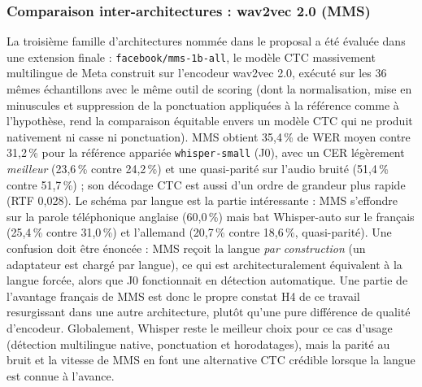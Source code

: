 \documentclass[12pt]{report}
\begin{document}
\subsubsection{Comparaison inter-architectures : wav2vec 2.0 (MMS)}
La troisième famille d'architectures nommée dans le proposal a été évaluée dans une extension finale : \texttt{facebook/mms-1b-all}, le modèle CTC massivement multilingue de Meta construit sur l'encodeur wav2vec 2.0, exécuté sur les 36 mêmes échantillons avec le même outil de scoring (dont la normalisation, mise en minuscules et suppression de la ponctuation appliquées à la référence comme à l'hypothèse, rend la comparaison équitable envers un modèle CTC qui ne produit nativement ni casse ni ponctuation). MMS obtient 35,4\,\% de WER moyen contre 31,2\,\% pour la référence appariée \texttt{whisper-small} (J0), avec un CER légèrement \emph{meilleur} (23,6\,\% contre 24,2\,\%) et une quasi-parité sur l'audio bruité (51,4\,\% contre 51,7\,\%) ; son décodage CTC est aussi d'un ordre de grandeur plus rapide (RTF 0,028). Le schéma par langue est la partie intéressante : MMS s'effondre sur la parole téléphonique anglaise (60,0\,\%) mais bat Whisper-auto sur le français (25,4\,\% contre 31,0\,\%) et l'allemand (20,7\,\% contre 18,6\,\%, quasi-parité). Une confusion doit être énoncée : MMS reçoit la langue \emph{par construction} (un adaptateur est chargé par langue), ce qui est architecturalement équivalent à la langue forcée, alors que J0 fonctionnait en détection automatique. Une partie de l'avantage français de MMS est donc le propre constat H4 de ce travail resurgissant dans une autre architecture, plutôt qu'une pure différence de qualité d'encodeur. Globalement, Whisper reste le meilleur choix pour ce cas d'usage (détection multilingue native, ponctuation et horodatages), mais la parité au bruit et la vitesse de MMS en font une alternative CTC crédible lorsque la langue est connue à l'avance.
\end{document}
